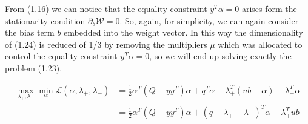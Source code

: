 From (1.16) we can notice that the equality constraint $y^T \alpha = 0$ arises form the stationarity condition $\partial_{{b}} \mathcal{W}=0$. So, again, for simplicity, we can again consider the bias term $b$ embedded into the weight vector. In this way the dimensionality of (1.24) is reduced of 1/3 by removing the multipliers $\mu$ which was allocated to control the equality constraint $y^T \alpha=0$, so we will end up solving exactly the problem (1.23).

\begin{align*}
    \max_{\lambda_+,\lambda_-} \min_{\alpha} \mathcal{L}(\alpha,\lambda_+,\lambda_-) &= \frac{1}{2} \alpha^T (Q + yy^T)\alpha+q^T\alpha - \lambda_+^T (ub - \alpha) - \lambda_-^T \alpha \\
    &= \frac{1}{2} \alpha^T (Q + yy^T)\alpha + (q + \lambda_+ - \lambda_-)^T \alpha - \lambda_+^T ub \tag{1.31}
\end{align*}